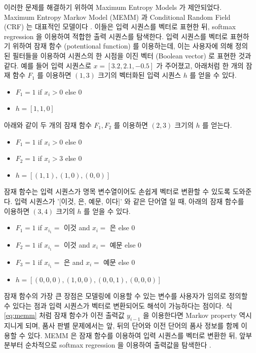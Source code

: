 \documentclass[11pt]{article}
\begin{document}
이러한 문제를 해결하기 위하여 Maximum Entropy Models 가 제안되었다.
Maximum Entropy Markov Model (MEMM) 과 Conditional Random Field (CRF) 는 대표적인 모델이다 \citep{mccallum2000maximum, lafferty2001conditional}.
이들은 입력 시퀀스를 벡터로 표현한 뒤, softmax regression 을 이용하여 적합한 출력 시퀀스를 탐색한다.
입력 시퀀스를 벡터로 표현하기 위하여 잠재 함수 (potentional function) 를 이용하는데, 이는 사용자에 의해 정의된 필터들을 이용하여 시퀀스의 한 시점을 이진 벡터 (Boolean vector) 로 표현한 것과 같다.
예를 들어 입력 시퀀스로 $x=[3.2, 2.1, -0.5]$ 가 주어졌고, 아래처럼 한 개의 잠재 함수 $F_1$ 를 이용하면 $(1, 3)$ 크기의 벡터화된 입력 시퀀스 $h$ 를 얻을 수 있다.

\begin{itemize}[noitemsep]
  \item $F_1 = 1$ if $x_i > 0$ else $0$
  \item $h = [1, 1, 0]$
\end{itemize}

아래와 같이 두 개의 잠재 함수 $F_1, F_2$ 를 이용하면 $(2, 3)$ 크기의 $h$ 를 얻는다.

\begin{itemize}[noitemsep]
  \item $F_1 = 1$ if $x_i > 0$ else $0$
  \item $F_2 = 1$ if $x_i > 3$ else $0$
  \item $h = [(1, 1), (1, 0), (0, 0)]$
\end{itemize}

잠재 함수는 입력 시퀀스가 명목 변수열이어도 손쉽게 벡터로 변환할 수 있도록 도와준다.
입력 시퀀스가 '[이것, 은, 예문, 이다]' 와 같은 단어열 일 때, 아래의 잠재 함수를 이용하면 $(3, 4)$ 크기의 $h$ 를 얻을 수 있다.

\begin{itemize}[noitemsep]
  \item $F_1 = 1$ if $x_{i_1} =$ 이것 and $x_{i} =$ 은 else $0$
  \item $F_2 = 1$ if $x_{i_1} =$ 이것 and $x_{i} =$ 예문 else $0$
  \item $F_3 = 1$ if $x_{i_1} =$ 은 and $x_{i} =$ 예문 else $0$
  \item $h = [(0, 0, 0), (1, 0, 0), (0, 0, 1), (0, 0, 0)]$
\end{itemize}

잠재 함수의 가장 큰 장점은 모델링에 이용할 수 있는 변수를 사용자가 임의로 정의할 수 있다는 점과 입력 시퀀스가 벡터로 변환되어도 해석이 가능하다는 점이다.
식 \ref{eq:memm} 처럼 잠재 함수가 이전 출력값 $y_{i-1}$ 을 이용한다면 Markov property 역시 지니게 되며, 품사 판별 문제에서는 앞, 뒤의 단어와 이전 단어의 품사 정보를 함께 이용할 수 있다.
MEMM 은 잠재 함수를 이용하여 입력 시퀀스를 벡터로 변환한 뒤, 앞부분부터 순차적으로 softmax regression 을 이용하여 출력값을 탐색한다 \citep{mccallum2000maximum}.
\end{document}

